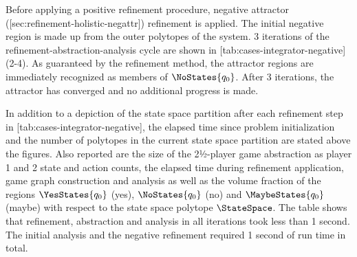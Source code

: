 
    Before applying a positive refinement procedure, negative attractor ([sec:refinement-holistic-negattr]) refinement is applied.
    The initial negative region is made up from the outer polytopes of the system.
    3 iterations of the refinement-abstraction-analysis cycle are shown in [tab:cases-integrator-negative] (2-4).
    As guaranteed by the refinement method, the attractor regions are immediately recognized as members of $\NoStates{q_0}$.
    After 3 iterations, the attractor has converged and no additional progress is made.

    In addition to a depiction of the state space partition after each refinement step in [tab:cases-integrator-negative], the elapsed time since problem initialization and the number of polytopes in the current state space partition are stated above the figures.
    Also reported are the size of the 2½-player game abstraction as player 1 and 2 state and action counts, the elapsed time during refinement application, game graph construction and analysis as well as the volume fraction of the regions $\YesStates{q_0}$ (yes), $\NoStates{q_0}$ (no) and $\MaybeStates{q_0}$ (maybe) with respect to the state space polytope $\StateSpace$.
    The table shows that refinement, abstraction and analysis in all iterations took less than 1 second.
    The initial analysis and the negative refinement required 1 second of run time in total.

